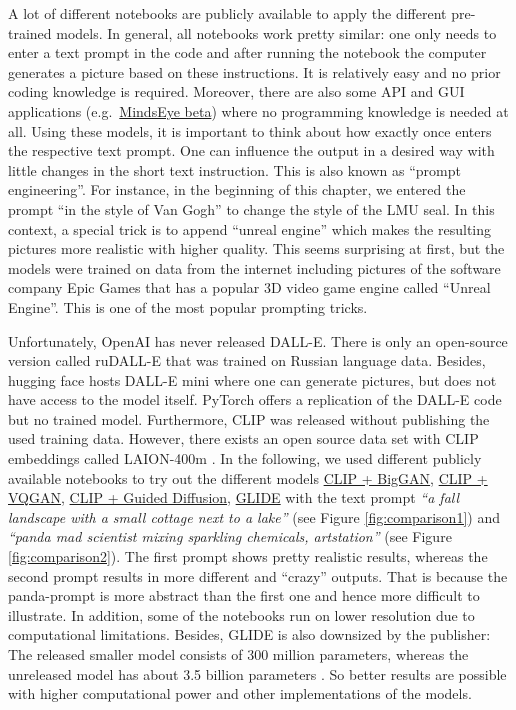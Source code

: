 \documentclass[
]{krantz}
\begin{document}
A lot of different notebooks are publicly available to apply the different pre-trained models. In general, all notebooks work pretty similar: one only needs to enter a text prompt in the code and after running the notebook the computer generates a picture based on these instructions. It is relatively easy and no prior coding knowledge is required. Moreover, there are also some API and GUI applications (e.g.~\href{https://multimodal.art/mindseye}{MindsEye beta}) where no programming knowledge is needed at all. Using these models, it is important to think about how exactly once enters the respective text prompt. One can influence the output in a desired way with little changes in the short text instruction. This is also known as ``prompt engineering''. For instance, in the beginning of this chapter, we entered the prompt ``in the style of Van Gogh'' to change the style of the LMU seal. In this context, a special trick is to append ``unreal engine'' \citep{unrealEngine} which makes the resulting pictures more realistic with higher quality. This seems surprising at first, but the models were trained on data from the internet including pictures of the software company Epic Games that has a popular 3D video game engine called ``Unreal Engine''. This is one of the most popular prompting tricks.

Unfortunately, OpenAI has never released DALL-E. There is only an open-source version called ruDALL-E \citep{ruDALLE} that was trained on Russian language data. Besides, hugging face hosts DALL-E mini \citep{DALLEmini} where one can generate pictures, but does not have access to the model itself. PyTorch offers a replication of the DALL-E code \citep{DALLEpytorch} but no trained model. Furthermore, CLIP was released without publishing the used training data. However, there exists an open source data set with CLIP embeddings called LAION-400m \citep{LAION}. In the following, we used different publicly available notebooks to try out the different models \href{https://colab.research.google.com/drive/1NCceX2mbiKOSlAd_o7IU7nA9UskKN5WR?usp=sharing}{CLIP + BigGAN},
\href{https://colab.research.google.com/drive/1ZAus_gn2RhTZWzOWUpPERNC0Q8OhZRTZ\#scrollTo=FhhdWrSxQhwg}{CLIP + VQGAN},
\href{https://colab.research.google.com/drive/12a_Wrfi2_gwwAuN3VvMTwVMz9TfqctNj\#scrollTo=X5gODNAMEUCR}{CLIP + Guided Diffusion},
\href{https://colab.research.google.com/github/openai/glide-text2im/blob/main/notebooks/text2im.ipynb}{GLIDE}
with the text prompt \emph{``a fall landscape with a small cottage next to a lake''} (see Figure \ref{fig:comparison1}) and \emph{``panda mad scientist mixing sparkling chemicals, artstation''} (see Figure \ref{fig:comparison2}). The first prompt shows pretty realistic results, whereas the second prompt results in more different and ``crazy'' outputs. That is because the panda-prompt is more abstract than the first one and hence more difficult to illustrate. In addition, some of the notebooks run on lower resolution due to computational limitations. Besides, GLIDE is also downsized by the publisher: The released smaller model consists of 300 million parameters, whereas the unreleased model has about 3.5 billion parameters \citep{GLIDE}. So better results are possible with higher computational power and other implementations of the models.
\end{document}
